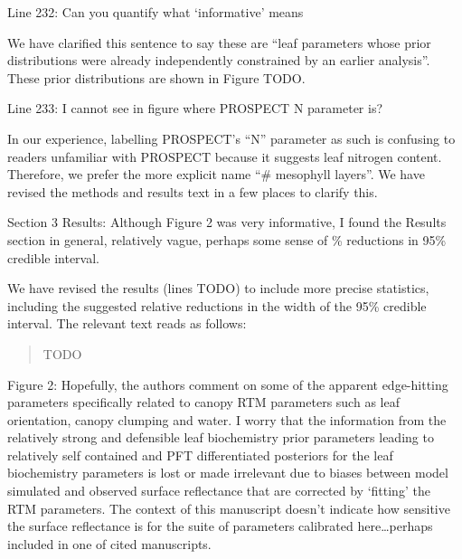 \begin{reviewer}
  Line 232: Can you quantify what ‘informative’ means
\end{reviewer}

We have clarified this sentence to say these are ``leaf parameters whose prior distributions were already independently constrained by an earlier analysis''. These prior distributions are shown in Figure TODO.

\begin{reviewer}
  Line 233: I cannot see in figure where PROSPECT N parameter is?
\end{reviewer}

In our experience, labelling PROSPECT’s ``N'' parameter as such is confusing to readers unfamiliar with PROSPECT because it suggests leaf nitrogen content.
Therefore, we prefer the more explicit name ``\# mesophyll layers''.
We have revised the methods and results text in a few places to clarify this.

\begin{reviewer}
  Section 3 Results: Although Figure 2 was very informative, I found the Results section in general, relatively vague, perhaps some sense of \% reductions in 95\% credible interval.
\end{reviewer}

We have revised the results (lines TODO) to include more precise statistics, including the suggested relative reductions in the width of the 95\% credible interval.
The relevant text reads as follows:

\begin{quote}
TODO
\end{quote}

\begin{reviewer}
  Figure 2: Hopefully, the authors comment on some of the apparent edge-hitting parameters specifically related to canopy RTM parameters such as leaf orientation, canopy clumping and water.
  I worry that the information from the relatively strong and defensible leaf biochemistry prior parameters leading to relatively self contained and PFT differentiated posteriors for the leaf biochemistry parameters is lost or made irrelevant due to biases between model simulated and observed surface reflectance that are corrected by ‘fitting’ the RTM parameters.
  The context of this manuscript doesn’t indicate how sensitive the surface reflectance is for the suite of parameters calibrated here\ldots perhaps included in one of cited manuscripts.
\end{reviewer}

